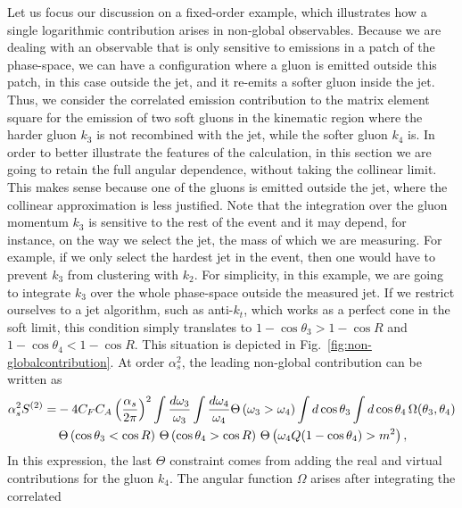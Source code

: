 Let us focus our discussion on a fixed-order example, which illustrates how a single logarithmic contribution arises in non-global observables. 
%
Because we are dealing with an observable that is only sensitive to emissions in a patch of the phase-space, we can have a configuration where a gluon is emitted outside this patch, in this case outside the jet, and it re-emits a softer gluon inside the jet. 
%
Thus, we consider the correlated emission contribution to the matrix
element square for the emission of two soft gluons in the kinematic
region where the harder gluon $k_3$ is not recombined with the jet,
while the softer gluon $k_4$ is. 
%
In order to better illustrate the features of the calculation, in this section we are going to retain the full angular dependence, without taking the collinear limit. 
%
This makes sense because one of the gluons is emitted outside the jet, where the collinear approximation is less justified. 
%
Note that the integration over the gluon momentum $k_3$ is sensitive
to the rest of the event and it may depend, for instance, on the way
we select the jet, the mass of which we are measuring. For example, if
we only select the hardest jet in the event, then one would have to
prevent $k_3$ from clustering with $k_2$. For simplicity, in this example, we are going to
integrate $k_3$ over the whole phase-space outside the measured jet.
%
If we restrict ourselves to a jet algorithm, such as anti-$k_t$, which works as a perfect cone in the soft limit, this condition simply translates to $ 1-  \cos \theta_3> 1- \cos R$ and $1- \cos \theta_4<1- \cos R$.
%
This situation is depicted in Fig.~\ref{fig:non-globalcontribution}.
%
At order $\alpha_s^2$, the leading non-global contribution can be
written as
\begin{align}
\alpha_s^2 S^{(2)} = & -4 C_F C_A \left ( \frac{\alpha_s}{2\pi} \right)^2 \int \frac{d\omega_3}{\omega_3} \int \frac{d \omega_4}{\omega_4} 
\Theta\left(\omega_3>\omega_4 \right)
\int d\cos\theta_3 \int d\cos\theta_4  \, \Omega(\theta_3,\theta_4)\nonumber \\ 
& \,\Theta\left(\cos \theta_3<\cos R\right)
\, \Theta \left(\cos \theta_4> \cos R \right)
 \, \Theta \left(\omega_4 Q (1-\cos\theta_4)>m^2 \right),
\end{align}
In this expression, the last $\Theta$ constraint comes from adding the
real and virtual contributions for the gluon $k_4$.
%
The angular function $\Omega$ arises after integrating the correlated
